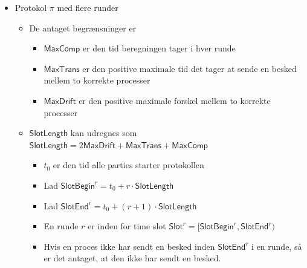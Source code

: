 \documentclass[a4, english]{article}
\begin{document}
\begin{itemize}
  \item Protokol $\pi$ med flere runder
  \begin{itemize}
  	\item De antaget begrænsninger er 
    \begin{itemize}
    	\item $\mathsf{MaxComp}$ er den tid beregningen tager i hver runde 
      \item $\mathsf{MaxTrans}$ er den positive maximale tid det tager at sende en besked mellem to korrekte processer
      \item $\mathsf{MaxDrift}$ er den positive maximale forskel mellem to korrekte processer  
    \end{itemize}
    \item $\mathsf{SlotLength}$ kan udregnes som $\mathsf{SlotLength}=2\mathsf{MaxDrift} + \mathsf{MaxTrans} + \mathsf{MaxComp}$
    \begin{itemize}
    	\item $t_0$ er den tid alle parties starter protokollen
      \item Lad $\mathsf{SlotBegin}^r = t_0 + r \cdot \mathsf{SlotLength}$
   		\item Lad $\mathsf{SlotEnd}^r=t_0+(r+1) \cdot \mathsf{SlotLength}$
      \item En runde $r$ er inden for time slot $\mathsf{Slot}^r = [ \mathsf{SlotBegin}^r, \mathsf{SlotEnd}^r)$
      \item Hvis en proces ikke har sendt en besked inden $\mathsf{SlotEnd}^r$ i en runde, så er det antaget, at den ikke har sendt en besked.
    \end{itemize}
  \end{itemize}
\end{itemize}
\end{document}

